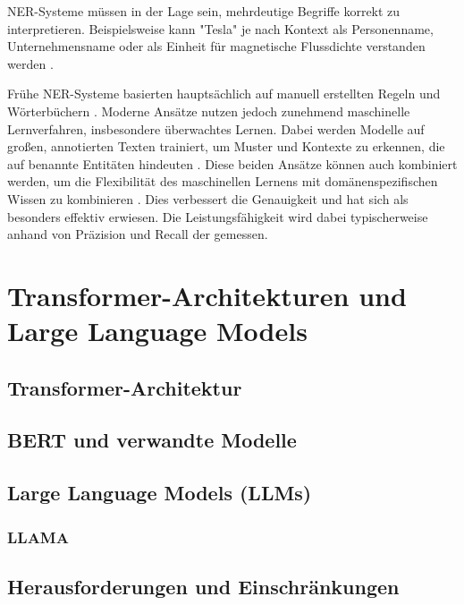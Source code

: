 \gls{NER}-Systeme müssen in der Lage sein, mehrdeutige Begriffe korrekt zu interpretieren. Beispielsweise kann "Tesla" je nach Kontext als Personenname, Unternehmensname oder als Einheit für magnetische Flussdichte verstanden werden \cite{RebalaGopinath2019AItM}.

Frühe \gls{NER}-Systeme basierten hauptsächlich auf manuell erstellten Regeln und Wörterbüchern \cite{nadeau2007survey}. Moderne Ansätze nutzen jedoch zunehmend maschinelle Lernverfahren, insbesondere überwachtes Lernen. Dabei werden Modelle auf großen, annotierten Texten trainiert, um Muster und Kontexte zu erkennen, die auf benannte Entitäten hindeuten \cite{nadeau2007survey}.
Diese beiden Ansätze können auch kombiniert werden, um die Flexibilität des maschinellen Lernens mit domänenspezifischen Wissen zu kombinieren \cite{nadeau2007survey}. Dies verbessert die Genauigkeit und hat sich als besonders effektiv erwiesen. Die Leistungsfähigkeit wird dabei typischerweise anhand von Präzision und Recall der gemessen.

\section{Transformer-Architekturen und Large Language Models}
\label{sec:transformers-llms}

\subsection{Transformer-Architektur}
\label{subsec:transformer-architecture}

\subsection{BERT und verwandte Modelle}
\label{subsec:bert}

\subsection{Large Language Models (LLMs)}
\label{subsec:llms}

\subsubsection{LLAMA}
\label{subsubsec:LLAMA}

\subsection{Herausforderungen und Einschränkungen}
\label{subsec:llm-challenges}

